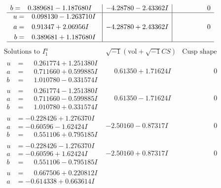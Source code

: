 \documentclass[1p]{elsarticle_modified}
\theoremstyle{definition}
\newcommand{\I}{\sqrt{-1}}
\begin{document}
$$\begin{array}{c|c|c}
\begin{aligned}
b &= \phantom{-}0.389681 - 1.187680 I\end{aligned}
 & -4.28780 - 2.43362 I & \phantom{-0.000000 } 0 \\ \hline\begin{aligned}
u &= \phantom{-}0.098130 - 1.263710 I \\
a &= \phantom{-}0.91347 + 2.06956 I \\
b &= \phantom{-}0.389681 + 1.187680 I\end{aligned}
 & -4.28780 + 2.43362 I & \phantom{-0.000000 } 0\\
 \hline 
 \end{array}$$\newpage$$\begin{array}{c|c|c}  
\text{Solutions to }I^u_{1}& \I (\text{vol} + \sqrt{-1}CS) & \text{Cusp shape}\\
 \hline 
\begin{aligned}
u &= \phantom{-}0.261774 + 1.251380 I \\
a &= \phantom{-}0.711660 + 0.599885 I \\
b &= \phantom{-}1.010780 - 0.331574 I\end{aligned}
 & \phantom{-}0.61350 + 1.71624 I & \phantom{-0.000000 } 0 \\ \hline\begin{aligned}
u &= \phantom{-}0.261774 - 1.251380 I \\
a &= \phantom{-}0.711660 - 0.599885 I \\
b &= \phantom{-}1.010780 + 0.331574 I\end{aligned}
 & \phantom{-}0.61350 - 1.71624 I & \phantom{-0.000000 } 0 \\ \hline\begin{aligned}
u &= -0.228426 + 1.276370 I \\
a &= -0.60596 - 1.62424 I \\
b &= \phantom{-}0.551106 + 0.795185 I\end{aligned}
 & -2.50160 - 0.87317 I & \phantom{-0.000000 } 0 \\ \hline\begin{aligned}
u &= -0.228426 - 1.276370 I \\
a &= -0.60596 + 1.62424 I \\
b &= \phantom{-}0.551106 - 0.795185 I\end{aligned}
 & -2.50160 + 0.87317 I & \phantom{-0.000000 } 0 \\ \hline\begin{aligned}
u &= \phantom{-}0.667506 + 0.220812 I \\
a &= -0.614338 + 0.663614 I \\

\end{aligned}
\end{array}$$
\end{document}
